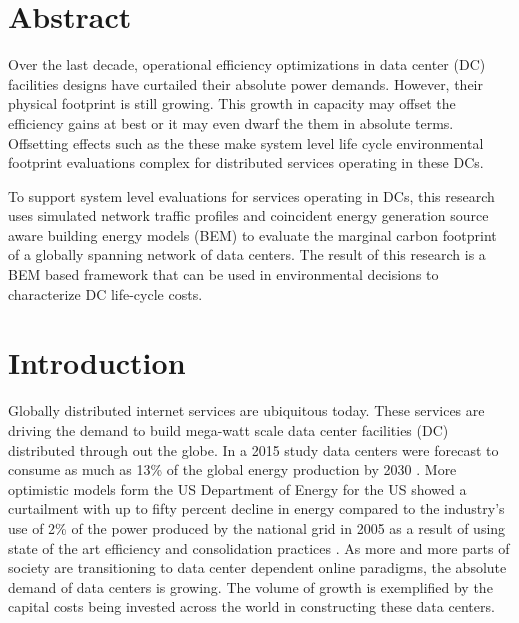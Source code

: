 \section{Abstract}	%
\addtocounter{section}{1}



Over the last decade, operational efficiency optimizations in data center (DC) facilities designs have curtailed their absolute power demands. However, their physical footprint is still growing. This growth in capacity may offset the efficiency gains at best or it may even dwarf the them in absolute terms. Offsetting effects such as the these make system level life cycle environmental footprint evaluations complex for distributed services operating in these DCs. 

To support system level evaluations for services operating in DCs, this research uses simulated network traffic profiles and coincident energy generation source aware building energy models (BEM) to evaluate the marginal carbon footprint of a globally spanning network of data centers. The result of this research is a BEM based framework that can be used in environmental decisions to characterize DC life-cycle costs.




\section{Introduction}
Globally distributed internet services are ubiquitous today. These services are driving the demand to build mega-watt scale data center facilities (DC) distributed through out the globe. In a 2015 study data centers were forecast to consume as much as 13\% of the global energy production by 2030 \citep{andrae15}. More optimistic models form the US Department of Energy for the US showed a curtailment with up to fifty percent decline in energy compared to the industry's use of 2\% of the power produced by the national grid in 2005 as a result of using state of the art efficiency and consolidation practices \citep{Shehabi16}. As more and more parts of society are transitioning to data center dependent online paradigms, the absolute demand of data centers is growing. The volume of growth is exemplified by the capital costs being invested across the world in constructing these data centers.

